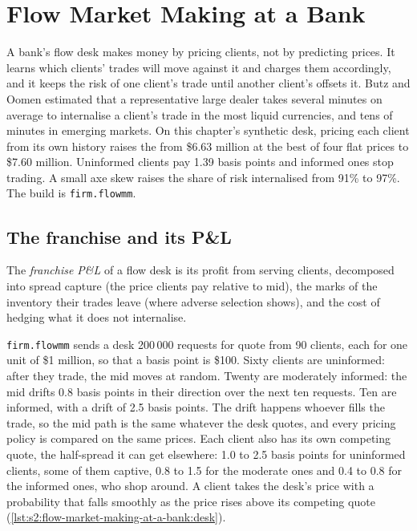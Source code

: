 \chapter{Flow Market Making at a Bank}\label{ch:s2:flow-market-making-at-a-bank}

A bank's flow desk makes money by pricing clients, not by predicting prices. It learns which clients' trades will move against it and charges them
accordingly, and it keeps the risk of one client's trade until another client's offsets it. Butz and Oomen estimated that a representative
large dealer takes several minutes on average to internalise a client's trade in the most liquid currencies, and tens of minutes in emerging markets.
On this chapter's synthetic desk, pricing each client from its own history raises the  from \$6.63 million at the best
of four flat prices to \$7.60 million. Uninformed clients pay 1.39 basis points and informed ones stop trading. A small axe skew raises the share of risk
internalised from 91\% to 97\%. The build is \texttt{firm.flowmm}.

\section{The franchise and its P\&L}

\begin{definition}[Franchise P\&L]\label{def:s2:flow-market-making-at-a-bank:franchise}
The \emph{franchise P\&L} of a flow desk is its profit from serving clients, decomposed into spread capture (the price clients
pay relative to mid), the marks of the inventory their trades leave (where adverse selection shows), and the cost of hedging what it does not
internalise.
\end{definition}

\texttt{firm.flowmm} sends a desk 200\,000 requests for quote from 90 clients, each for one unit of \$1 million, so that a basis point is \$100. Sixty
clients are uninformed: after they trade, the mid moves at random. Twenty are moderately informed: the mid drifts 0.8 basis points in their direction
over the next ten requests. Ten are informed, with a drift of 2.5 basis points. The drift happens whoever fills the trade, so the mid path is the same
whatever the desk quotes, and every pricing policy is compared on the same prices. Each client also has its own competing quote, the half-spread it
can get elsewhere: 1.0 to 2.5 basis points for uninformed clients, some of them captive, 0.8 to 1.5 for the moderate ones and 0.4 to 0.8 for the
informed ones, who shop around. A client takes the desk's price with a probability that falls smoothly as the price rises above its competing quote
(\cref{lst:s2:flow-market-making-at-a-bank:desk}).

